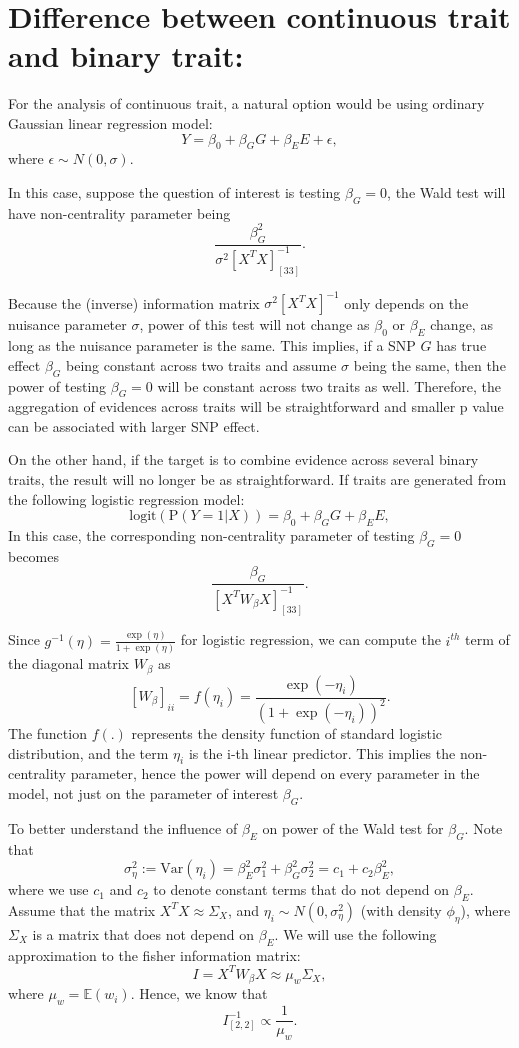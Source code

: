\documentclass[
]{article}
\begin{document}
\hypertarget{difference-between-continuous-trait-and-binary-trait}{%
\section{Difference between continuous trait and binary
trait:}\label{difference-between-continuous-trait-and-binary-trait}}

For the analysis of continuous trait, a natural option would be using
ordinary Gaussian linear regression model:
\[Y = \beta_0 + \beta_G G + \beta_E E+\epsilon,\] where
\(\epsilon \sim N(0,\sigma)\).

In this case, suppose the question of interest is testing \(\beta_G=0\),
the Wald test will have non-centrality parameter being
\[\frac{\beta_G^2}{\sigma^2[X^TX]^{-1}_{[33]}}.\]

Because the (inverse) information matrix \(\sigma^2[X^TX]^{-1}\) only
depends on the nuisance parameter \(\sigma\), power of this test will
not change as \(\beta_0\) or \(\beta_E\) change, as long as the nuisance
parameter is the same. This implies, if a SNP \(G\) has true effect
\(\beta_G\) being constant across two traits and assume \(\sigma\) being
the same, then the power of testing \(\beta_G = 0\) will be constant
across two traits as well. Therefore, the aggregation of evidences
across traits will be straightforward and smaller p value can be
associated with larger SNP effect.

On the other hand, if the target is to combine evidence across several
binary traits, the result will no longer be as straightforward. If
traits are generated from the following logistic regression model:
\[\text{logit}(\text{P}(Y=1|X)) = \beta_0 + \beta_G G + \beta_E E,\] In
this case, the corresponding non-centrality parameter of testing
\(\beta_G=0\) becomes \[\frac{\beta_G}{[X^TW_\beta X]^{-1}_{[33]}}.\]

Since \(g^{-1}(\eta)= \frac{\exp(\eta)}{1+\exp(\eta)}\) for logistic
regression, we can compute the \(i^{th}\) term of the diagonal matrix
\(W_\beta\) as
\[[W_\beta]_{ii} = f(\eta_i)=\frac{\exp(-\eta_i)}{(1+\exp(-\eta_i))^2}.\]
The function \(f(.)\) represents the density function of standard
logistic distribution, and the term \(\eta_i\) is the i-th linear
predictor. This implies the non-centrality parameter, hence the power
will depend on every parameter in the model, not just on the parameter
of interest \(\beta_G\).

To better understand the influence of \(\beta_E\) on power of the Wald
test for \(\beta_G\). Note that
\[\sigma_\eta^2:=\text{Var}(\eta_i) = \beta_E^2\sigma_1^2+\beta_G^2\sigma_2^2 = c_1 +c_2\beta_E^2,\]
where we use \(c_1\) and \(c_2\) to denote constant terms that do not
depend on \(\beta_E\). Assume that the matrix \(X^TX \approx \Sigma_X\),
and \(\eta_i\sim N(0,\sigma_\eta^2)\) (with density \(\phi_\eta\)),
where \(\Sigma_X\) is a matrix that does not depend on \(\beta_E\). We
will use the following approximation to the fisher information
matrix:\[I = X^TW_\beta X \approx \mu_w \Sigma_X,\] where
\(\mu_w = \mathbb{E}(w_i)\). Hence, we know that
\[I^{-1}_{[2,2]} \propto \frac{1}{\mu_w}.\]
\end{document}

